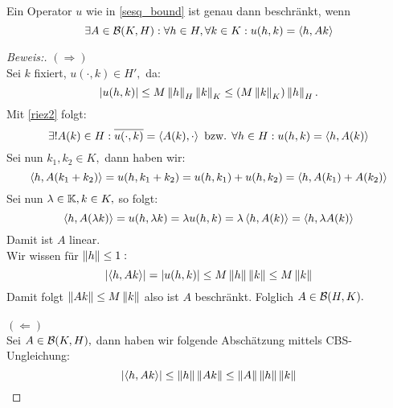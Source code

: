 \begin{theorem}
	\label{sesq_darstellung}
Ein Operator $u$ wie in \ref{sesq_bound} ist genau dann beschränkt, wenn \[\exists A \in \mathcal{B}(K, H): \forall h \in H, \forall k \in K: u(h, k) = \left\langle h, Ak\right\rangle\]

\begin{proof}[Beweis:] $(\Longrightarrow)$ \\
Sei $k$ fixiert, $u(\cdot, k) \in H',$ da:
\[\left\lvert u(h, k) \right\rvert \leq M \left\lVert h\right\rVert_H \left\lVert k\right\rVert_K \leq (M \left\lVert k\right\rVert_K)\left\lVert h\right\rVert_H.\] Mit \ref{riez2} folgt:
\[\exists!A(k) \in H: \overline{u(\cdot, k)} = \left\langle A(k), \cdot\right\rangle \text{ bzw. } \forall h \in H: u(h, k) = \left\langle h, A(k)\right\rangle\]
Sei nun $k_1, k_2 \in K,$ dann haben wir:
\[\left\langle h, A(k_1 + k_2)\right\rangle = u(h, k_1 + k_2) = u(h, k_1)+u(h, k_2) = \left\langle h, A(k_1) + A(k_2)\right\rangle\] Sei nun $\lambda \in \mathbb{K}, k \in K,$ so folgt: \[\left\langle h, A(\lambda k)\right\rangle = u(h, \lambda k)= \lambda u(h, k) = \lambda \left\langle h, A(k)\right\rangle = \left\langle h, \lambda A(k)\right\rangle\] Damit ist $A$ linear.\\ 
Wir wissen für $\left\lVert h\right\rVert \leq 1:$ \[\left\lvert \left\langle h, Ak\right\rangle \right\rvert = \left\lvert u(h, k) \right\rvert \leq M \left\lVert h\right\rVert\left\lVert k\right\rVert \leq M\left\lVert k\right\rVert\] Damit folgt $\left\lVert Ak\right\rVert \leq M \left\lVert k\right\rVert$ also ist $A$ beschränkt. Folglich $A \in \mathcal{B}(H, K).$ \\
\\
$(\Longleftarrow)$ \\
Sei $A \in \mathcal{B}(K, H),$ dann haben wir folgende Abschätzung mittels CBS-Ungleichung: \[\left\lvert \left\langle h, Ak\right\rangle \right\rvert \leq \left\lVert h\right\rVert\left\lVert Ak\right\rVert \leq \left\lVert A\right\rVert\left\lVert h\right\rVert\left\lVert k\right\rVert\]
\end{proof}
\end{theorem}



